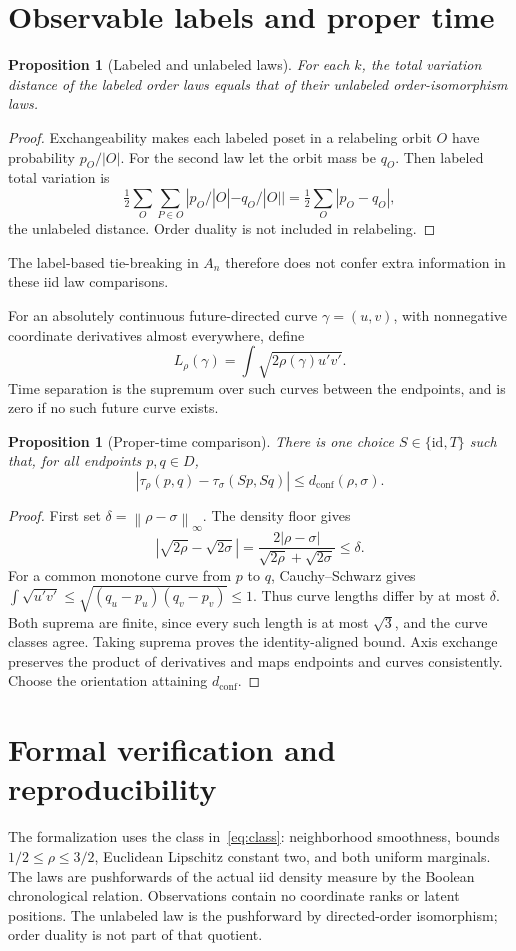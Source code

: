 \documentclass[11pt]{article}
\newtheorem{proposition}[theorem]{Proposition}
\theoremstyle{remark}
\newcommand{\dc}{d_{\mathrm{conf}}}
\newcommand{\norm}[1]{\left\lVert #1\right\rVert_\infty}
\begin{document}
\section{Observable labels and proper time}
\begin{proposition}[Labeled and unlabeled laws]
For each $k$, the total variation distance of the labeled order laws
equals that of their unlabeled order-isomorphism laws.
\end{proposition}
\begin{proof}
Exchangeability makes each labeled poset in a relabeling orbit $O$
have probability $p_O/|O|$. For the second law let the orbit mass be
$q_O$. Then labeled total variation is
\[
 \tfrac12\sum_O\sum_{P\in O}
       |p_O/|O|-q_O/|O||=\tfrac12\sum_O|p_O-q_O|,
\]
the unlabeled distance. Order duality is not included in relabeling.
\end{proof}
The label-based tie-breaking in $A_n$ therefore does not confer extra
information in these iid law comparisons.

For an absolutely continuous future-directed curve $\gamma=(u,v)$,
with nonnegative coordinate derivatives almost everywhere, define
\[
 L_\rho(\gamma)=\int\sqrt{2\rho(\gamma)u'v'}.
\]
Time separation is the supremum over such curves between the endpoints,
and is zero if no such future curve exists.
\begin{proposition}[Proper-time comparison]
There is one choice $S\in\{\mathrm{id},T\}$ such that, for all
endpoints $p,q\in D$,
\[
 |\tau_\rho(p,q)-\tau_\sigma(Sp,Sq)|\le\dc(\rho,\sigma).
\]
\end{proposition}
\begin{proof}
First set $\delta=\norm{\rho-\sigma}$. The density floor gives
\[
 |\sqrt{2\rho}-\sqrt{2\sigma}|
 =\frac{2|\rho-\sigma|}{\sqrt{2\rho}+\sqrt{2\sigma}}\le\delta.
\]
For a common monotone curve from $p$ to $q$, Cauchy--Schwarz gives
$\int\sqrt{u'v'}\le\sqrt{(q_u-p_u)(q_v-p_v)}\le1$.
Thus curve lengths differ by at most $\delta$. Both suprema are
finite, since every such length is at most $\sqrt3$, and the curve
classes agree. Taking suprema proves the identity-aligned bound.
Axis exchange preserves the product of derivatives and maps endpoints
and curves consistently. Choose the orientation attaining $\dc$.
\end{proof}

\section{Formal verification and reproducibility}\label{sec:formal}
The formalization uses the class in~\eqref{eq:class}: neighborhood
smoothness, bounds $1/2\le\rho\le3/2$, Euclidean Lipschitz constant two,
and both uniform marginals. The laws are pushforwards of the actual iid
density measure by the Boolean chronological relation. Observations
contain no coordinate ranks or latent positions. The unlabeled law is
the pushforward by directed-order isomorphism; order duality is not
part of that quotient.
\end{document}
